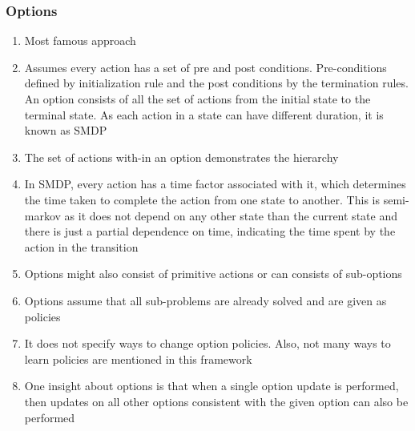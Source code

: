 \subsubsection{Options}
\begin{enumerate}
\item[] Most famous approach

\item[] Assumes every action has a set of pre and post conditions. Pre-conditions defined by initialization rule and the post conditions by the termination rules. An option consists of all the set of actions from the initial state to the terminal state. As each action in a state can have different duration, it is known as SMDP

\item[] The set of actions with-in an option demonstrates the hierarchy

\item[] In SMDP, every action has a time factor associated with it, which determines the time taken to complete the action from one state to another. This is semi-markov as it does not depend on any other state than the current state and there is just a partial dependence on time, indicating the time spent by the action in the transition

\item[] Options might also consist of primitive actions or can consists of sub-options

\item[] Options assume that all sub-problems are already solved and are given as policies

\item[] It does not specify ways to change option policies. Also, not many ways to learn policies are mentioned in this framework

\item[] One insight about options is that when a single option update is performed, then updates on all other options consistent with the given option can also be performed 
\end{enumerate}




